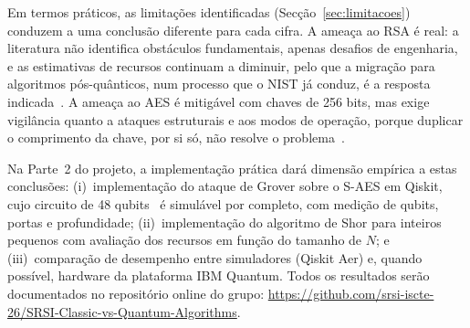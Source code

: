 \documentclass[11pt,a4paper]{article}
\begin{document}
Em termos práticos, as limitações identificadas (Secção~\ref{sec:limitacoes}) conduzem a uma conclusão diferente para cada cifra. A ameaça ao RSA é real: a literatura não identifica obstáculos fundamentais, apenas desafios de engenharia, e as estimativas de recursos continuam a diminuir, pelo que a migração para algoritmos pós-quânticos, num processo que o NIST já conduz, é a resposta indicada~\cite{chethana2025}. A ameaça ao AES é mitigável com chaves de 256 bits, mas exige vigilância quanto a ataques estruturais e aos modos de operação, porque duplicar o comprimento da chave, por si só, não resolve o problema~\cite{chethana2025}.

Na Parte~2 do projeto, a implementação prática dará dimensão empírica a estas conclusões: (i)~implementação do ataque de Grover sobre o S-AES em Qiskit, cujo circuito de 48 qubits~\cite{wang2022} é simulável por completo, com medição de qubits, portas e profundidade; (ii)~implementação do algoritmo de Shor para inteiros pequenos com avaliação dos recursos em função do tamanho de $N$; e (iii)~comparação de desempenho entre simuladores (Qiskit Aer) e, quando possível, hardware da plataforma IBM Quantum. Todos os resultados serão documentados no repositório online do grupo: \url{https://github.com/srsi-iscte-26/SRSI-Classic-vs-Quantum-Algorithms}.
\end{document}

